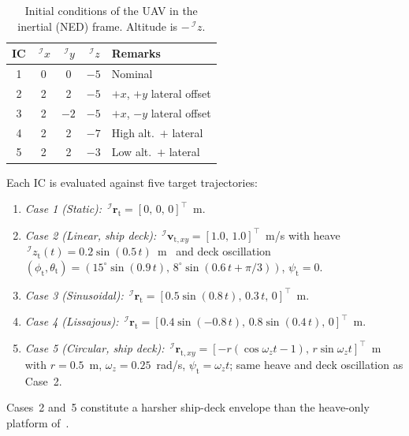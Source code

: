 \begin{table}[!t]
    \centering
    \caption{Initial conditions of the UAV in the inertial (NED) frame. Altitude is $-\,^\mathcal{I}z$.}
    \label{initial conditions: table}
    \begin{tabular}{ccccl}
    \toprule
        \textbf{IC} & $\,^\mathcal{I}x$ & $\,^\mathcal{I}y$ & $\,^\mathcal{I}z$ & \textbf{Remarks} \\
    \midrule
        1 & \phantom{-}0 & \phantom{-}0 & $-5$ & Nominal \\
        2 & \phantom{-}2 & \phantom{-}2 & $-5$ & $+x$, $+y$ lateral offset \\
        3 & \phantom{-}2 & $-2$         & $-5$ & $+x$, $-y$ lateral offset \\
        4 & \phantom{-}2 & \phantom{-}2 & $-7$ & High alt.\ $+$ lateral \\
        5 & \phantom{-}2 & \phantom{-}2 & $-3$ & Low alt.\ $+$ lateral \\
    \bottomrule
    \end{tabular}
\end{table}

Each IC is evaluated against five target trajectories:
\begin{enumerate}
    \item \textit{Case 1 (Static):}  $\,^\mathcal{I}\boldsymbol{r}_\text{t} = [0,\,0,\,0]^\top$~m.
    \item \textit{Case 2 (Linear, ship deck):} $\,^\mathcal{I}\boldsymbol{v}_{\text{t},xy} = [1.0,\,1.0]^\top$~m/s with heave $\,^\mathcal{I}z_\text{t}(t)=0.2\sin(0.5\,t)$~m~\cite{lin2022} and deck oscillation $(\phi_\text{t},\theta_\text{t})=(15^\circ\sin(0.9\,t),\,8^\circ\sin(0.6\,t+\pi/3))$, $\psi_\text{t}=0$.
    \item \textit{Case 3 (Sinusoidal):} $\,^\mathcal{I}\boldsymbol{r}_\text{t} = [0.5\sin(0.8\,t),\,0.3\,t,\,0]^\top$~m.
    \item \textit{Case 4 (Lissajous):} $\,^\mathcal{I}\boldsymbol{r}_\text{t} = [0.4\sin(-0.8\,t),\,0.8\sin(0.4\,t),\,0]^\top$~m.
    \item \textit{Case 5 (Circular, ship deck):} $\,^\mathcal{I}\boldsymbol{r}_{\text{t},xy} = [-r(\cos\omega_z t -1),\,r\sin\omega_z t]^\top$~m with $r=0.5$~m, $\omega_z = 0.25$~rad/s, $\psi_\text{t}=\omega_z t$; same heave and deck oscillation as Case~2.
\end{enumerate}
Cases~2 and~5 constitute a harsher ship-deck envelope than the heave-only platform of~\cite{lin2022}.

